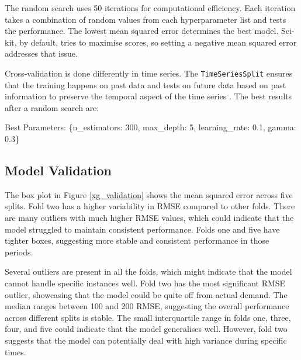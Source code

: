 \documentclass[mstat,12pt]{unswthesis}
\newenvironment{Shaded}{\begin{snugshade}}{\end{snugshade}}
\newcommand{\DecValTok}[1]{\textcolor[rgb]{0.00,0.00,0.81}{#1}}
\newcommand{\FloatTok}[1]{\textcolor[rgb]{0.00,0.00,0.81}{#1}}
\newcommand{\NormalTok}[1]{#1}
\newcommand{\StringTok}[1]{\textcolor[rgb]{0.31,0.60,0.02}{#1}}
\begin{document}
The random search uses 50 iterations for computational efficiency. Each
iteration takes a combination of random values from each hyperparameter
list and tests the performance. The lowest mean squared error determines
the best model. Sci-kit, by default, tries to maximise scores, so
setting a negative mean squared error addresses that issue.

Cross-validation is done differently in time series. The
\texttt{TimeSeriesSplit} ensures that the training happens on past data
and tests on future data based on past information to preserve the
temporal aspect of the time series \cite{scikit-learn2024}. The best
results after a random search are:

\begin{Shaded}
\begin{Highlighting}[]
\NormalTok{Best Parameters: \{}\StringTok{\textquotesingle{}n\_estimators\textquotesingle{}}\NormalTok{: }\DecValTok{300}\NormalTok{, }
                  \StringTok{\textquotesingle{}max\_depth\textquotesingle{}}\NormalTok{: }\DecValTok{5}\NormalTok{, }
                  \StringTok{\textquotesingle{}learning\_rate\textquotesingle{}}\NormalTok{: }\FloatTok{0.1}\NormalTok{, }
                  \StringTok{\textquotesingle{}gamma\textquotesingle{}}\NormalTok{: }\FloatTok{0.3}\NormalTok{\}}
\end{Highlighting}
\end{Shaded}

\subsection{Model Validation}\label{model-validation}

The box plot in Figure \ref{xg_validation} shows the mean squared error
across five splits. Fold two has a higher variability in RMSE compared
to other folds. There are many outliers with much higher RMSE values,
which could indicate that the model struggled to maintain consistent
performance. Folds one and five have tighter boxes, suggesting more
stable and consistent performance in those periods.

Several outliers are present in all the folds, which might indicate that
the model cannot handle specific instances well. Fold two has the most
significant RMSE outlier, showcasing that the model could be quite off
from actual demand. The median ranges between 100 and 200 RMSE,
suggesting the overall performance across different splits is stable.
The small interquartile range in folds one, three, four, and five could
indicate that the model generalises well. However, fold two suggests
that the model can potentially deal with high variance during specific
times.
\end{document}
